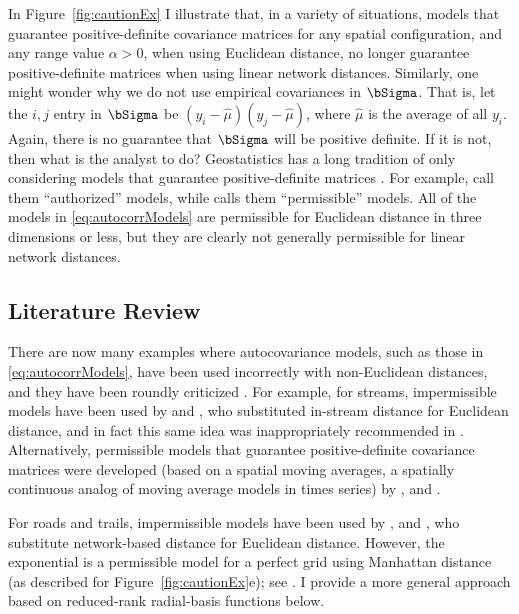 In Figure~\ref{fig:cautionEx} I illustrate that, in a variety of situations, models that guarantee positive-definite covariance matrices for any spatial configuration, and any range value $\alpha > 0$, when using Euclidean distance, no longer guarantee positive-definite matrices when using linear network distances. Similarly, one might wonder why we do not use empirical covariances in $\bSigma$.  That is, let the $i,j$ entry in $\bSigma$ be $(y_i - \hat{\mu})(y_j - \hat{\mu})$, where $\hat{\mu}$ is the average of all $y_i$.  Again, there is no guarantee that $\bSigma$ will be positive definite.  If it is not, then what is the analyst to do? Geostatistics has a long tradition of only considering models that guarantee positive-definite matrices \citep[][p. 161]{Jour:Huij:mini:1978}. For example, \citet[][p. 80]{Webs:Oliv:geos:2007} call them ``authorized'' models, while \citet[][p. 87]{Goov:geos:1997} calls them ``permissible'' models.  All of the models in \ref{eq:autocorrModels} are permissible for Euclidean distance in three dimensions or less, but they are clearly not generally permissible for linear network distances.

\subsection*{Literature Review}

There are now many examples where autocovariance models, such as those in \ref{eq:autocorrModels}, have been used incorrectly with non-Euclidean distances, and they have been roundly criticized \citep{Curr:NonE:2006}.  For example, for streams, impermissible models have been used by \citet{Cres:Maju:spat:1997} and \citet{Gard:Sull:Lemb:pred:2003}, who substituted in-stream distance for Euclidean distance, and in fact this same idea was inappropriately recommended in \citet{Okab:Sugi:spat:2012}. Alternatively, permissible models that guarantee positive-definite covariance matrices were developed (based on a spatial moving averages, a spatially continuous analog of moving average models in times series) by \citet{Ver:Pete:Theo:spat:2006}, \citet{Cres:Frey:Harc:Smit:spat:2006} and \citet{Ver:Pete:Move:2010}. 

For roads and trails, impermissible models have been used by \citet{Shio:Shio:stre:2011}, \citet{Selb:Kock:spat:2013} and \citet{Ladl:Avga:Whea:Boyc:pred:2016}, who substitute network-based distance for Euclidean distance.  However, the exponential is a permissible model for a perfect grid using Manhattan distance (as described for Figure~\ref{fig:cautionEx}e); see \citet{Curr:NonE:2006}. I provide a more general approach based on reduced-rank radial-basis functions below. 

